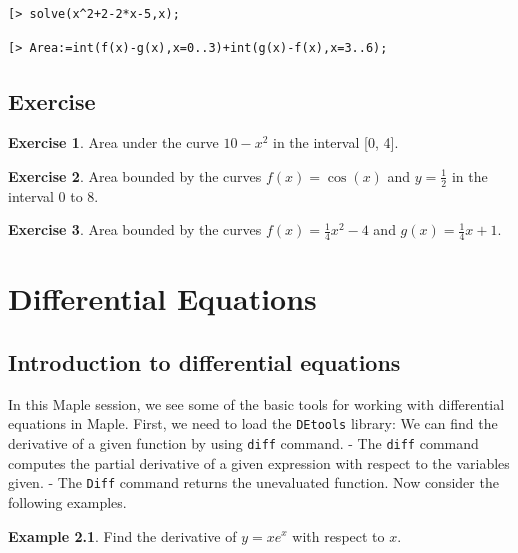 \documentclass[
]{book}
\theoremstyle{definition}
\theoremstyle{definition}
\newtheorem{example}{Example}[chapter]
\theoremstyle{definition}
\newtheorem{exercise}{Exercise}[chapter]
\theoremstyle{definition}
\theoremstyle{remark}
\begin{document}
\begin{verbatim}
[> solve(x^2+2-2*x-5,x);
\end{verbatim}

\begin{verbatim}
[> Area:=int(f(x)-g(x),x=0..3)+int(g(x)-f(x),x=3..6);
\end{verbatim}

\section{Exercise}\label{exercise-7}

\begin{exercise}
\protect\hypertarget{exr:unnamed-chunk-37}{}\label{exr:unnamed-chunk-37}Area under the curve \(10 - x^2\) in the interval {[}0, 4{]}.
\end{exercise}

\begin{exercise}
\protect\hypertarget{exr:unnamed-chunk-38}{}\label{exr:unnamed-chunk-38}Area bounded by the curves \(f(x) = \cos(x)\) and \(y = \frac{1}{2}\) in the interval 0 to 8.
\end{exercise}

\begin{exercise}
\protect\hypertarget{exr:unnamed-chunk-39}{}\label{exr:unnamed-chunk-39}Area bounded by the curves \(f(x) = \frac{1}{4}x^2 - 4\) and \(g(x) = \frac{1}{4}x + 1\).
\end{exercise}

\chapter{Differential Equations}\label{differential-equations}

\section{Introduction to differential equations}\label{introduction-to-differential-equations}

In this Maple session, we see some of the basic tools for working with differential equations in Maple.
First, we need to load the \texttt{DEtools} library:
We can find the derivative of a given function by using \texttt{diff} command.
- The \texttt{diff} command computes the partial derivative of a given expression with respect to the variables given.
- The \texttt{Diff} command returns the unevaluated function. Now consider the following examples.

\begin{example}
\protect\hypertarget{exm:unnamed-chunk-40}{}\label{exm:unnamed-chunk-40}Find the derivative of \(y=xe^x\) with respect to \(x\).
\end{example}
\end{document}
